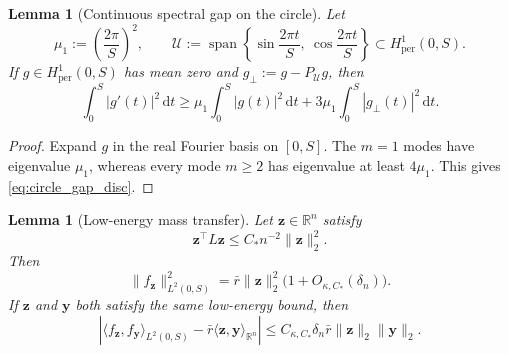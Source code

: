 \documentclass[11pt]{article}
\numberwithin{equation}{section}
\newtheorem{lemma}[theorem]{Lemma}
\theoremstyle{definition}
\theoremstyle{remark}
\begin{document}
\begin{lemma}[Continuous spectral gap on the circle]\label{lem:circle_gap_disc}
	Let
	\[
	\mu_1:=\left(\frac{2\pi}{S}\right)^2,
	\qquad
	\mathcal U:=\operatorname{span}\left\{
	\sin\frac{2\pi t}{S},\ \cos\frac{2\pi t}{S}
	\right\}\subset H^1_{\mathrm{per}}(0,S).
	\]
	If $g\in H^1_{\mathrm{per}}(0,S)$ has mean zero and
	$g_\perp:=g-P_{\mathcal U}g$, then
	\begin{equation}\label{eq:circle_gap_disc}
		\int_0^S|g'(t)|^2\,\mathrm dt
		\ge
		\mu_1\int_0^S|g(t)|^2\,\mathrm dt
		+
		3\mu_1\int_0^S|g_\perp(t)|^2\,\mathrm dt.
	\end{equation}
\end{lemma}

\begin{proof}
	Expand $g$ in the real Fourier basis on $[0,S]$. The $m=1$ modes
	have eigenvalue $\mu_1$, whereas every mode $m\ge 2$ has eigenvalue at
	least $4\mu_1$. This gives \eqref{eq:circle_gap_disc}.
\end{proof}

\begin{lemma}[Low-energy mass transfer]\label{lem:low_energy_mass_transfer}
	Let $\boldsymbol{z}\in\mathbb{R}^n$ satisfy
	\[
	\boldsymbol{z}^\top L\boldsymbol{z}\le C_*n^{-2}\|\boldsymbol{z}\|_2^2.
	\]
	Then
	\begin{equation}\label{eq:low_energy_mass_transfer}
		\|f_{\boldsymbol{z}}\|_{L^2(0,S)}^2
		=
		\bar r\|\boldsymbol{z}\|_2^2\bigl(1+O_{\kappa,C_*}(\delta_n)\bigr).
	\end{equation}
	If $\boldsymbol{z}$ and $\boldsymbol{y}$ both satisfy the same
	low-energy bound, then
	\begin{equation}\label{eq:bilinear_mass_transfer}
		\left|
		\langle f_{\boldsymbol{z}},f_{\boldsymbol{y}}\rangle_{L^2(0,S)}
		-\bar r\langle\boldsymbol{z},\boldsymbol{y}\rangle_{\mathbb{R}^n}
		\right|
		\le
		C_{\kappa,C_*}\delta_n\bar r
		\|\boldsymbol{z}\|_2\|\boldsymbol{y}\|_2.
	\end{equation}
\end{lemma}
\end{document}
